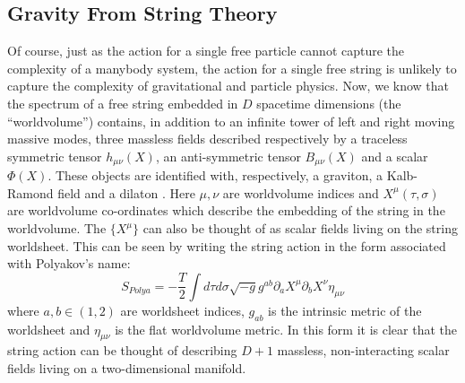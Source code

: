 \documentclass[11pt,a4paper,nofootinbib]{revtex4-1}
\begin{document}
\subsection{Gravity From String Theory}

Of course, just as the action for a single free particle cannot capture the complexity of a manybody system, the action for a single free string is unlikely to capture the complexity of gravitational and particle physics. Now, we know that the spectrum of a free string embedded in $ D $ spacetime dimensions (the ``worldvolume'') contains, in addition to an infinite tower of left and right moving massive modes, three massless fields described respectively by a traceless symmetric tensor $ h_{\mu\nu}(X) $, an anti-symmetric tensor $ B_{\mu\nu}(X) $ and a scalar $ \Phi(X) $. These objects are identified with, respectively, a graviton, a Kalb-Ramond field and a dilaton \cite[Sec 2.3.2]{Tong2010Lectures}. Here $ \mu, \nu $ are worldvolume indices and $ X^{\mu}(\tau,\sigma) $ are worldvolume co-ordinates which describe the embedding of the string in the worldvolume. The $ \{X^\mu\} $ can also be thought of as scalar fields living on the string worldsheet. This can be seen by writing the string action in the form associated with Polyakov's name:
\begin{equation}\label{eqn:polyakov-flat}
	S_{Polya} = -\frac{T}{2} \int d\tau d\sigma \sqrt{-g} g^{ab} \partial_a X^\mu \partial_b X^\nu \eta_{\mu\nu}
\end{equation}
where $ a,b \in (1,2) $ are worldsheet indices, $ g_{ab} $ is the intrinsic metric of the worldsheet and $ \eta_{\mu\nu} $ is the flat worldvolume metric. In this form it is clear that the string action can be thought of describing $ D+1 $ massless, non-interacting scalar fields living on a two-dimensional manifold.
\end{document}
